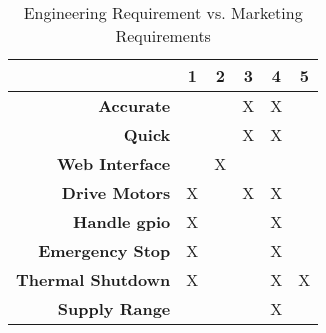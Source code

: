 \begin{table}[ht]
	\caption{Engineering Requirement vs. Marketing Requirements}
	\label{table:Val}
	\centering
	\begin{tabular}{|r |c |c |c |c |c|} 
		\hline\hline
		&1&2&3&4&5\\
		\hline
		\textbf{Accurate} &  & & X & X & \\
		\hline
		\textbf{Quick} &  & & X & X & \\
		\hline
		\textbf{Web Interface} & & X & & & \\
		\hline
		\textbf{Drive Motors} & X & & X & X & \\
		\hline
		\textbf{Handle \gls{gpio}} & X & & & X & \\
		\hline
		\textbf{Emergency Stop} & X & & & X & \\
		\hline
		\textbf{Thermal Shutdown } & X & & & X & X \\
		\hline
		\textbf{Supply Range} & & & & X &   \\

	\hline 
	\end{tabular}
\end{table}